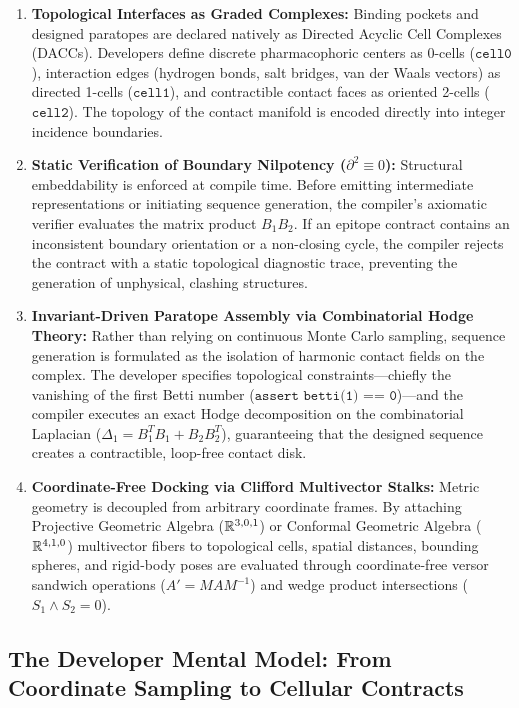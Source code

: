 \begin{enumerate}[leftmargin=1.2cm]
    \item \textbf{Topological Interfaces as Graded Complexes:}  
    Binding pockets and designed paratopes are declared natively as Directed Acyclic Cell Complexes (DACCs). Developers define discrete pharmacophoric centers as 0-cells ($\texttt{cell0}$), interaction edges (hydrogen bonds, salt bridges, van der Waals vectors) as directed 1-cells ($\texttt{cell1}$), and contractible contact faces as oriented 2-cells ($\texttt{cell2}$). The topology of the contact manifold is encoded directly into integer incidence boundaries.

    \item \textbf{Static Verification of Boundary Nilpotency ($\partial^2 \equiv 0$):}  
    Structural embeddability is enforced at compile time. Before emitting intermediate representations or initiating sequence generation, the compiler’s axiomatic verifier evaluates the matrix product $B_1 B_2$. If an epitope contract contains an inconsistent boundary orientation or a non-closing cycle, the compiler rejects the contract with a static topological diagnostic trace, preventing the generation of unphysical, clashing structures.

    \item \textbf{Invariant-Driven Paratope Assembly via Combinatorial Hodge Theory:}  
    Rather than relying on continuous Monte Carlo sampling, sequence generation is formulated as the isolation of harmonic contact fields on the complex. The developer specifies topological constraints—chiefly the vanishing of the first Betti number ($\texttt{assert betti(1) == 0}$)—and the compiler executes an exact Hodge decomposition on the combinatorial Laplacian ($\Delta_1 = B_1^T B_1 + B_2 B_2^T$), guaranteeing that the designed sequence creates a contractible, loop-free contact disk.

    \item \textbf{Coordinate-Free Docking via Clifford Multivector Stalks:}  
    Metric geometry is decoupled from arbitrary coordinate frames. By attaching Projective Geometric Algebra ($\mathbb{R}^{3,0,1}$) or Conformal Geometric Algebra ($\mathbb{R}^{4,1,0}$) multivector fibers to topological cells, spatial distances, bounding spheres, and rigid-body poses are evaluated through coordinate-free versor sandwich operations ($A' = M A M^{-1}$) and wedge product intersections ($S_1 \wedge S_2 = 0$).
\end{enumerate}

\subsection{The Developer Mental Model: From Coordinate Sampling to Cellular Contracts}
\label{subsec:mental_model}

